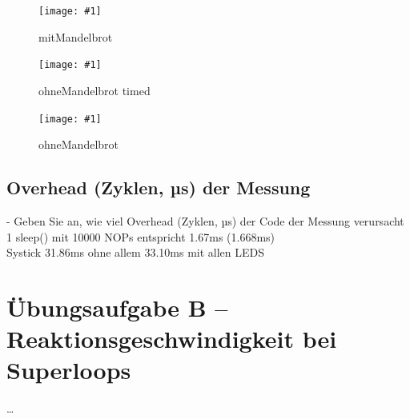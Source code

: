 \documentclass{article}
\newcommand{\bild}[3]{\begin{figure}[h!]		\begin{center}			\texttt{[image: \#1]}			\caption{#2}		\end{center}	\end{figure}}
\begin{document}
\bild{02_mitMandelbrot}{mitMandelbrot}{width=\textwidth}
\bild{03_ohneMandelbrot_time}{ohneMandelbrot timed}{width=\textwidth}
\bild{03_ohneMandelbrot}{ohneMandelbrot}{width=\textwidth}

\subsection{Overhead (Zyklen, µs) der Messung}
-  Geben Sie an, wie viel Overhead (Zyklen, µs) der Code der Messung verursacht \\
	1 sleep() mit 10000 NOPs entspricht 1.67ms (1.668ms) \\
	Systick 31.86ms ohne allem
	33.10ms mit allen LEDS

\section{Übungsaufgabe B – Reaktionsgeschwindigkeit bei Superloops}
\ldots
\end{document}
